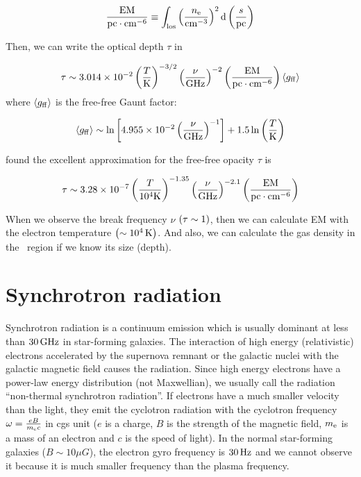 \begin{equation}\label{eq:essential_radio4n57}
    \frac{\mathrm{EM}}{\mathrm{pc} \cdot \mathrm{cm}^{-6}} \equiv \int_{\mathrm{los}}\left(\frac{n_{\mathrm{e}}}{\mathrm{cm}^{-3}}\right)^2 \mathrm{d}\left(\frac{s}{\mathrm{pc}}\right)
\end{equation}

Then, we can write the optical depth $\tau$ in

\begin{equation}\label{eq:essential_radio4n58}
    \tau \sim 3.014 \times 10^{-2}\left(\frac{T}{\mathrm{K}}\right)^{-3/2}\left(\frac{\nu}{\mathrm{GHz}}\right)^{-2}\left(\frac{\mathrm{EM}}{\mathrm{pc} \cdot \mathrm{cm}^{-6}}\right)\left\langle g_{\mathrm{ff}}\right\rangle
\end{equation}
where $\left\langle g_{\mathrm{ff}}\right\rangle$ is the free-free Gaunt factor:

\begin{equation}\label{eq:essential_radio4n59}
    \left\langle g_{\mathrm{ff}}\right\rangle \sim \ln \left[4.955 \times 10^{-2}\left(\frac{\nu}{\mathrm{GHz}}\right)^{-1}\right]+1.5 \ln \left(\frac{T}{\mathrm{K}}\right)
\end{equation}

\citet{Mezger1967} found the excellent approximation for the free-free opacity $\tau$ is

\begin{equation}\label{eq:essential_radio4n60}
    \tau \sim 3.28 \times 10^{-7}\left(\frac{T}{10^4 \mathrm{K}}\right)^{-1.35}\left(\frac{\nu}{\mathrm{GHz}}\right)^{-2.1}\left(\frac{\mathrm{EM}}{\mathrm{pc} \cdot \mathrm{cm}^{-6}}\right)
\end{equation}

When we observe the break frequency $\nu$ $\left(\tau \sim 1\right)$, then we can calculate EM with the electron temperature $\left(\sim10^4\,\mathrm{K}\right)$.
And also, we can calculate the gas density in the \ih~region if we know its size (depth).





\section{Synchrotron radiation}\label{sec:synchrotronradiation}

Synchrotron radiation is a continuum emission which is usually dominant at less than $30\,\mathrm{GHz}$ in star-forming galaxies.
The interaction of high energy (relativistic) electrons accelerated by the supernova remnant or the galactic nuclei with the galactic magnetic field causes the radiation.
Since high energy electrons have a power-law energy distribution (not Maxwellian), we usually call the radiation ``non-thermal synchrotron radiation''.
If electrons have a much smaller velocity than the light, they emit the cyclotron radiation with the cyclotron frequency $\omega = \frac{eB}{m_{\mathrm{e}}c}$ in cgs unit ($e$ is a charge, $B$ is the strength of the magnetic field, $m_{\mathrm{e}}$ is a mass of an electron and $c$ is the speed of light).
In the normal star-forming galaxies ($B\sim10\mu G$), the electron gyro frequency is $30\,\mathrm{Hz}$ and we cannot observe it because it is much smaller frequency than the plasma frequency.

